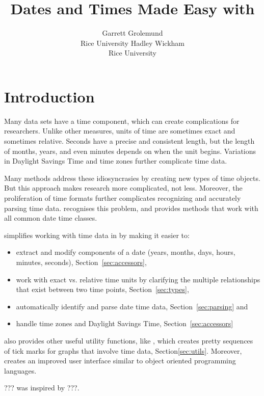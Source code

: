 \documentclass[article]{jss}
\author{Garrett Grolemund\\Rice University \And 
        Hadley Wickham\\Rice University}
\title{Dates and Times Made Easy with \pkg{lubridate}}
\begin{document}
\section{Introduction}

Many data sets have a time component, which can create complications for researchers. Unlike other measures, units of time are sometimes exact and sometimes relative.  Seconds have a precise and consistent length, but the length of months, years, and even minutes depends on when the unit begins. Variations in Daylight Savings Time and time zones further complicate time data.

Many  methods address these idiosyncrasies by creating new types of time objects.  But this approach makes research more complicated, not less. Moreover, the proliferation of time formats further complicates recognizing and accurately parsing time data.   recognises this problem, and provides methods that work with all common date time classes.

 simplifies working with time data in  by making it easier to:

\begin{itemize}
  \item extract and modify components of a date (years, months, days, hours, minutes, seconds), Section~\ref{sec:accessors},
  
  \item work with exact vs. relative time units by clarifying the multiple relationships that exist between two time points, Section~\ref{sec:types},
  
  \item automatically identify and parse date time data, Section~\ref{sec:parsing} and
  
  \item handle time zones and Daylight Savings Time, Section~\ref{sec:accessors} 
  
\end{itemize}

 also provides other useful utility functions, like , which creates pretty sequences of tick marks for graphs that involve time data,  Section\ref{sec:utils}. Moreover,  creates an improved user interface similar to object oriented programming languages.

??? was inspired by ???.
\end{document}
